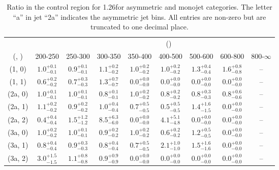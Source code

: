 \begin{table}[h!]
\tiny
\centering
\caption{Ratio in the \mmj control region for 1.26\ifb for asymmetric and monojet categories. The letter ``a'' in jet \eg ``2a''  indicates the asymmetric jet bins. All entries are non-zero but are truncated to one decimal place.\label{tab:ratiosep_mumu_ewk_asym}}
\begin{tabular}
{ccccccccc}
	\hline\hline
&	& \multicolumn{8}{c}{\scalht (\gev)} \\ 
	 (\njet,  \nb) & 200-250 & 250-300 & 300-350 & 350-400 & 400-500 & 500-600 & 600-800 & 800-$\infty$ \\ [0.8ex] 
\hline
	(1, 0) & $1.0^{+ 0.1 }_{- 0.1 }$ & $0.9^{+ 0.1 }_{- 0.1 }$ & $1.1^{+ 0.2 }_{- 0.2 }$ & $1.0^{+ 0.2 }_{- 0.2 }$ & $1.0^{+ 0.2 }_{- 0.2 }$ & $1.3^{+ 0.4 }_{- 0.4 }$ & $1.6^{+ 0.8 }_{- 0.8 }$ & -- \\[0.5ex] 
	(1, 1) & $0.6^{+ 0.2 }_{- 0.2 }$ & $0.7^{+ 0.3 }_{- 0.3 }$ & $1.3^{+ 0.7 }_{- 0.7 }$ & $0.0^{+ 0.0 }_{- 0.0 }$ & $0.0^{+ 0.0 }_{- 0.0 }$ & $0.0^{+ 0.0 }_{- 0.0 }$ & $0.0^{+ 0.0 }_{- 0.0 }$ & -- \\[0.5ex] 
	(2a, 0) & $1.0^{+ 0.1 }_{- 0.1 }$ & $1.0^{+ 0.1 }_{- 0.1 }$ & $0.8^{+ 0.1 }_{- 0.1 }$ & $1.0^{+ 0.2 }_{- 0.2 }$ & $0.8^{+ 0.2 }_{- 0.2 }$ & $0.8^{+ 0.3 }_{- 0.3 }$ & $0.8^{+ 0.6 }_{- 0.6 }$ & -- \\[0.5ex] 
	(2a, 1) & $1.1^{+ 0.2 }_{- 0.2 }$ & $0.9^{+ 0.2 }_{- 0.2 }$ & $1.0^{+ 0.4 }_{- 0.4 }$ & $0.7^{+ 0.5 }_{- 0.5 }$ & $0.5^{+ 0.5 }_{- 0.5 }$ & $1.4^{+ 1.6 }_{- 1.5 }$ & $0.0^{+ 0.0 }_{- 0.0 }$ & -- \\[0.5ex] 
	(2a, 2) & $0.4^{+ 0.4 }_{- 0.4 }$ & $1.5^{+ 1.2 }_{- 1.2 }$ & $8.5^{+ 6.3 }_{- 6.0 }$ & $0.0^{+ 0.0 }_{- 0.0 }$ & $4.1^{+ 5.1 }_{- 4.8 }$ & $0.0^{+ 0.0 }_{- 0.0 }$ & $0.0^{+ 0.0 }_{- 0.0 }$ & -- \\[0.5ex] 
	(3a, 0) & $1.0^{+ 0.2 }_{- 0.2 }$ & $1.0^{+ 0.1 }_{- 0.1 }$ & $0.9^{+ 0.2 }_{- 0.2 }$ & $1.0^{+ 0.2 }_{- 0.2 }$ & $0.6^{+ 0.2 }_{- 0.2 }$ & $1.2^{+ 0.5 }_{- 0.5 }$ & $0.0^{+ 0.0 }_{- 0.0 }$ & -- \\[0.5ex] 
	(3a, 1) & $0.8^{+ 0.4 }_{- 0.4 }$ & $0.9^{+ 0.3 }_{- 0.3 }$ & $0.8^{+ 0.4 }_{- 0.4 }$ & $0.7^{+ 0.5 }_{- 0.5 }$ & $2.1^{+ 1.0 }_{- 1.0 }$ & $1.5^{+ 1.6 }_{- 1.6 }$ & $0.0^{+ 0.0 }_{- 0.0 }$ & -- \\[0.5ex] 
	(3a, 2) & $3.0^{+ 1.5 }_{- 1.5 }$ & $1.1^{+ 0.8 }_{- 0.8 }$ & $0.9^{+ 0.9 }_{- 0.9 }$ & $0.0^{+ 0.0 }_{- 0.0 }$ & $0.0^{+ 0.0 }_{- 0.0 }$ & $0.0^{+ 0.0 }_{- 0.0 }$ & $0.0^{+ 0.0 }_{- 0.0 }$ & -- \\[0.5ex] 

\end{tabular}
\end{table}

